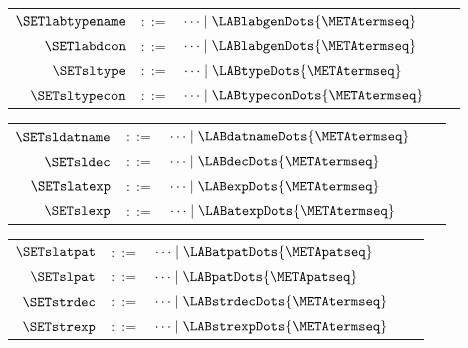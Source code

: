 \documentclass{jfp1}
\newcommand{\myfigure}{figure}
\newcommand{\sizeintables}{small}
\newcommand{\consgenslicetab}{tabular}
\newcommand{\syntslicetab}{tabular}
\begin{document}
\begin{\myfigure}[t]
\begin{\sizeintables}

\begin{\syntslicetab}[t]{rclrl}
$\SETlabtypename$  & $::=$  & $\dots\mid\LABlabgenDots{\METAtermseq}$\\
$\SETlabdcon$      & $::=$  & $\dots\mid\LABlabgenDots{\METAtermseq}$\\
$\SETsltype$       & $::=$  & $\dots\mid\LABtypeDots{\METAtermseq}$\\
$\SETsltypecon$    & $::=$  & $\dots\mid\LABtypeconDots{\METAtermseq}$\\
\end{\syntslicetab}
\hspace{0.02in}
\begin{\syntslicetab}[t]{rclrl}
$\SETsldatname$    & $::=$  & $\dots\mid\LABdatnameDots{\METAtermseq}$\\
$\SETsldec$        & $::=$  & $\dots\mid\LABdecDots{\METAtermseq}$\\
$\SETslatexp$      & $::=$  & $\dots\mid\LABexpDots{\METAtermseq}$\\
$\SETslexp$        & $::=$  & $\dots\mid\LABatexpDots{\METAtermseq}$\\
\end{\syntslicetab}
\hspace{0.02in}
\begin{\syntslicetab}[t]{rclrl}
$\SETslatpat$      & $::=$  & $\dots\mid\LABatpatDots{\METApatseq}$\\
$\SETslpat$        & $::=$  & $\dots\mid\LABpatDots{\METApatseq}$\\
$\SETstrdec$       & $::=$  & $\dots\mid\LABstrdecDots{\METAtermseq}$\\
$\SETstrexp$       & $::=$  & $\dots\mid\LABstrexpDots{\METAtermseq}$\\
\end{\syntslicetab}
\end{\sizeintables}

  \vspace{0.1in}

\begin{\sizeintables}


\begin{\consgenslicetab}{l}


\end{\consgenslicetab}
\end{\sizeintables}
\end{\myfigure}
\end{document}

